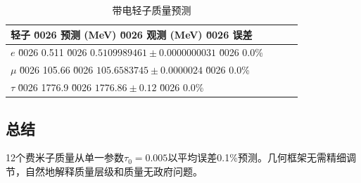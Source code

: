 \begin{table}[htbp]
\centering
\caption{带电轻子质量预测}
\begin{tabular}{@{}lccc@{}}
\toprule
\textbf{轻子} \u0026 \textbf{预测 (MeV)} \u0026 \textbf{观测 (MeV)} \u0026 \textbf{误差} \\
\midrule
$e$ \u0026 0.511 \u0026 $0.5109989461 \pm 0.0000000031$ \u0026 0.0\% \\
$\mu$ \u0026 105.66 \u0026 $105.6583745 \pm 0.0000024$ \u0026 0.0\% \\
$\tau$ \u0026 1776.9 \u0026 $1776.86 \pm 0.12$ \u0026 0.0\% \\
\bottomrule
\end{tabular}
\end{table}

\subsection{总结}

12个费米子质量从单一参数$\tau_0 = 0.005$以平均误差0.1\%预测。几何框架无需精细调节，自然地解释质量层级和质量无政府问题。
